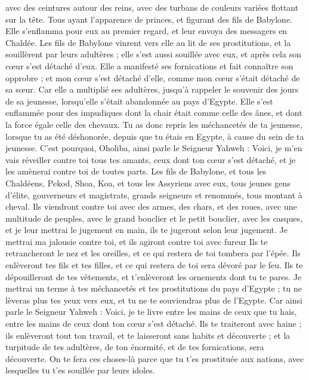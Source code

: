 \begin{multicols}{2}
avec des ceintures autour des reins, avec des turbans de couleurs variées flottant sur la tête. Tous ayant l'apparence de princes, et figurant des fils de Babylone.
Elle s'enflamma pour eux au premier regard, et leur envoya des messagers en Chaldée.
Les fils de Babylone vinrent vers elle au lit de ses prostitutions, et la souillèrent par leurs adultères ; elle s'est aussi souillée avec eux, et après cela son cœur s'est détaché d'eux.
Elle a manifesté ses fornications et fait connaître son opprobre ; et mon cœur s'est détaché d'elle, comme mon cœur s'était détaché de sa sœur.
Car elle a multiplié ses adultères, jusqu'à rappeler le souvenir des jours de sa jeunesse, lorsqu'elle s'était abandonnée au pays d'Egypte.
Elle s'est enflammée pour des impudiques dont la chair était comme celle des ânes, et dont la force égale celle des chevaux.
Tu as donc repris les méchancetés de ta jeunesse, lorsque tu as été déshonorée, depuis que tu étais en Egypte, à cause du sein de ta jeunesse.
C'est pourquoi, Oholiba, ainsi parle le Seigneur Yahweh : Voici, je m'en vais réveiller contre toi tous tes amants, ceux dont ton cœur s'est détaché, et je les amènerai contre toi de toutes parts.
Les fils de Babylone, et tous les Chaldéens, Pekod, Shoa, Koa, et tous les Assyriens avec eux, tous jeunes gens d'élite, gouverneurs et magistrats, grands seigneurs et renommés, tous montant à cheval.
Ils viendront contre toi avec des armes, des chars, et des roues, avec une multitude de peuples, avec le grand bouclier et le petit bouclier, avec les casques, et je leur mettrai le jugement en main, ils te jugeront selon leur jugement.
Je mettrai ma jalousie contre toi, et ils agiront contre toi avec fureur Ils te retrancheront le nez et les oreilles, et ce qui restera de toi tombera par l'épée. Ils enlèveront tes fils et tes filles, et ce qui restera de toi sera dévoré par le feu.
Ils te dépouilleront de tes vêtements, et t'enlèveront les ornements dont tu te pares.
Je mettrai un terme à tes méchancetés et tes prostitutions du pays d'Egypte ; tu ne lèveras plus tes yeux vers eux, et tu ne te souviendras plus de l'Egypte.
Car ainsi parle le Seigneur Yahweh : Voici, je te livre entre les mains de ceux que tu hais, entre les mains de ceux dont ton cœur s'est détaché.
Ils te traiteront avec haine ; ils enlèveront tout ton travail, et te laisseront sans habits et découverte ; et la turpitude de tes adultères, de ton énormité, et de tes fornications, sera découverte.
On te fera ces choses-là parce que tu t'es prostituée aux nations, avec lesquelles tu t'es souillée par leurs idoles.

\end{multicols}
